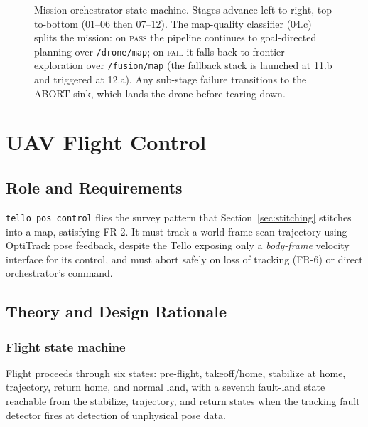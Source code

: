 \documentclass[conference]{IEEEtran}
\newcommand{\subsys}[1]{\texttt{#1}}      %
\begin{document}
\begin{figure}[t]
\caption{Mission orchestrator state machine. Stages advance left-to-right,
top-to-bottom (01--06 then 07--12). The map-quality classifier (04.c) splits the
mission: on \textsc{pass} the pipeline continues to goal-directed planning over
\texttt{/drone/map}; on \textsc{fail} it falls back to frontier exploration over
\texttt{/fusion/map} (the fallback stack is launched at 11.b and triggered at
12.a). Any sub-stage failure transitions to the ABORT sink, which lands the drone
before tearing down.}
\label{fig:fsm}
\end{figure}

\section{UAV Flight Control}
\label{sec:uav-control}

\subsection{Role and Requirements}
\subsys{tello\_pos\_control} flies the survey pattern that
Section~\ref{sec:stitching} stitches into a map, satisfying FR-2. It must track a
world-frame scan trajectory using OptiTrack pose feedback, despite the Tello
exposing only a \emph{body-frame} velocity interface for its control, and must abort safely on
loss of tracking (FR-6) or direct orchestrator's command.

\subsection{Theory and Design Rationale }
\subsubsection{Flight state machine}
Flight proceeds through six states: pre-flight, takeoff/home, stabilize at home,
trajectory, return home, and normal land, with a seventh fault-land state
reachable from the stabilize, trajectory, and return states when the tracking
fault detector fires at detection of unphysical pose data.
\end{document}
